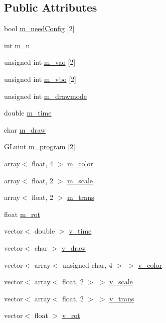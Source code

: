 \subsection*{Public Attributes}
\begin{DoxyCompactItemize}
\item 
bool \hyperlink{classShape_ac96ad62fd8b979f9a1e92b211922bb25}{m\-\_\-need\-Config} \mbox{[}2\mbox{]}
\item 
int \hyperlink{classShape_a14a1994dd7d7fc412b18d3ad2563556d}{m\-\_\-n}
\item 
unsigned int \hyperlink{classShape_a9a515d946d14526fe6d3cc566c4acf77}{m\-\_\-vao} \mbox{[}2\mbox{]}
\item 
unsigned int \hyperlink{classShape_af252a08a695affa2637645dcd4cdf4e9}{m\-\_\-vbo} \mbox{[}2\mbox{]}
\item 
unsigned int \hyperlink{classShape_a3cf20a9158443fa941b4e85a7b817816}{m\-\_\-drawmode}
\item 
double \hyperlink{classShape_aa8c2dca5ffd2e7f66cc4713e57ab029c}{m\-\_\-time}
\item 
char \hyperlink{classShape_a35589131828091da1fe3717f48e9c664}{m\-\_\-draw}
\item 
G\-Luint \hyperlink{classShape_a3689b5d3e0ab51e8e739699193ce9290}{m\-\_\-program} \mbox{[}2\mbox{]}
\item 
array$<$ float, 4 $>$ \hyperlink{classShape_a41389fbe5746a93b075acc98e485582c}{m\-\_\-color}
\item 
array$<$ float, 2 $>$ \hyperlink{classShape_a9af8ff3b5a90a8e42ea931969ec9428e}{m\-\_\-scale}
\item 
array$<$ float, 2 $>$ \hyperlink{classShape_ad2a5e6ad0362873a88ffcc69e5cb9b12}{m\-\_\-trans}
\item 
float \hyperlink{classShape_a43a38e552b2f2fc423dde3dd81dab0ce}{m\-\_\-rot}
\item 
vector$<$ double $>$ \hyperlink{classShape_af13b493550d418a20604baf5e1c8a0bd}{v\-\_\-time}
\item 
vector$<$ char $>$ \hyperlink{classShape_a6f426725f07e290ee150aab7be5b2587}{v\-\_\-draw}
\item 
vector$<$ array$<$ unsigned char, 4 $>$ $>$ \hyperlink{classShape_af3088673fcd7c8b642df4ecb157e53ff}{v\-\_\-color}
\item 
vector$<$ array$<$ float, 2 $>$ $>$ \hyperlink{classShape_ae2549de1dc4697ef18d2fa01d3e241b9}{v\-\_\-scale}
\item 
vector$<$ array$<$ float, 2 $>$ $>$ \hyperlink{classShape_a5fb4760689b0acae7a6088da0cba7d7b}{v\-\_\-trans}
\item 
vector$<$ float $>$ \hyperlink{classShape_a24f60964f7e4dc1b876a232f94948296}{v\-\_\-rot}
\end{DoxyCompactItemize}


